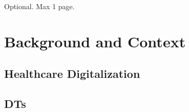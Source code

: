 \documentclass[12pt,a4paper,openright,twoside]{book}
\begin{document}
\glsresetall



\begin{acknowledgements} %
Optional. Max 1 page.
\end{acknowledgements}

\tableofcontents   
\listoffigures     %
\lstlistoflistings %

\mainmatter

\label{chap:introduction}



\part{Background and Context}

\chapter{Healthcare Digitalization}
\label{chap:back:health4.0}



\chapter{\aclp{DT}}
\label{chap:back:DT}
\end{document}
